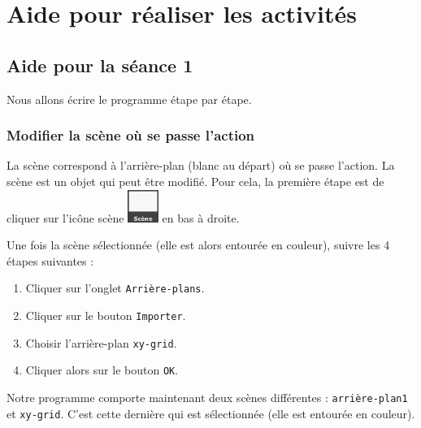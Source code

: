\newpage





%
%
%
%



\section{Aide pour réaliser les activités}

\subsection{Aide pour la séance 1}\label{correction_scratch1}




Nous allons écrire le programme étape par étape.


\subsubsection{Modifier la scène où se passe l'action}

La scène correspond à l'arrière-plan (blanc au départ) où se passe l'action. La scène est un objet qui peut être modifié. Pour cela, la première étape est de cliquer sur l'icône scène \includegraphics[width=1cm]{./images/scratch/Scene} en bas à droite.


Une fois la scène sélectionnée (elle est alors entourée en couleur), suivre les 4 étapes suivantes :

\begin{enumerate}
\item Cliquer sur l'onglet \texttt{Arrière-plans}.
\item Cliquer sur le bouton \texttt{Importer}.
\item Choisir l'arrière-plan \texttt{xy-grid}.
\item Cliquer alors sur le bouton \texttt{OK}. 
\end{enumerate}



Notre programme comporte maintenant deux scènes différentes : \texttt{arrière-plan1} et \texttt{xy-grid}. C'est cette dernière qui est sélectionnée (elle est entourée en couleur).

